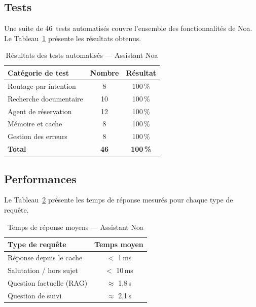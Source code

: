 \subsection{Tests}

Une suite de 46~tests automatisés couvre l'ensemble des fonctionnalités de Noa.
Le Tableau~\ref{tab:tests_noa} présente les résultats obtenus.

\vspace{6pt}
\begin{table}[H]
\centering
\caption{Résultats des tests automatisés — Assistant Noa}
\label{tab:tests_noa}
\begin{tabular}{|l|c|c|}
\hline
\textbf{Catégorie de test} & \textbf{Nombre} & \textbf{Résultat} \\
\hline
Routage par intention & 8 & 100\,\% \\
Recherche documentaire & 10 & 100\,\% \\
Agent de réservation & 12 & 100\,\% \\
Mémoire et cache & 8 & 100\,\% \\
Gestion des erreurs & 8 & 100\,\% \\
\hline
\textbf{Total} & \textbf{46} & \textbf{100\,\%} \\
\hline
\end{tabular}
\end{table}

\subsection{Performances}

Le Tableau~\ref{tab:perf_noa} présente les temps de réponse mesurés pour chaque type de requête.

\vspace{6pt}
\begin{table}[H]
\centering
\caption{Temps de réponse moyens — Assistant Noa}
\label{tab:perf_noa}
\begin{tabular}{|l|c|}
\hline
\textbf{Type de requête} & \textbf{Temps moyen} \\
\hline
Réponse depuis le cache & $<$ 1\,ms \\
Salutation / hors sujet & $<$ 10\,ms \\
Question factuelle (RAG) & $\approx$ 1,8\,s \\
Question de suivi & $\approx$ 2,1\,s \\
\hline
\end{tabular}
\end{table}

